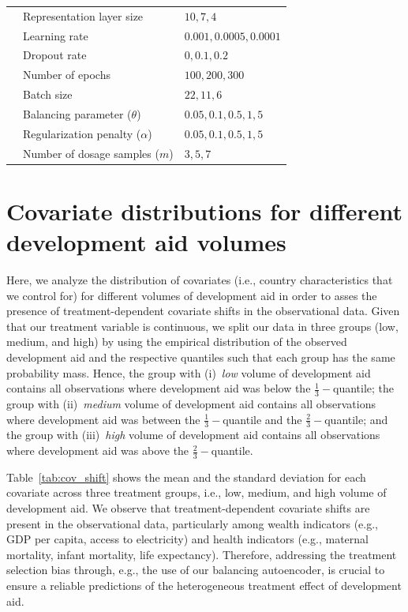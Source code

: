 \documentclass[sigconf]{acmart}
\begin{document}
\begin{table}[H]
\begin{center}
{\begin{tabular}{l l l }
    & Representation layer size & $ 10, 7, 4$ \\
    & Learning rate & $0.001, 0.0005, 0.0001$ \\
    & Dropout rate & $0, 0.1, 0.2$ \\
    & Number of epochs & $ 100, 200, 300$ \\
    & Batch size & $22, 11, 6$ \\
    & Balancing parameter ($\theta$) & $0.05, 0.1, 0.5, 1, 5$ \\
    & Regularization penalty ($\alpha$) & $0.05, 0.1, 0.5, 1, 5$ \\
    & Number of dosage samples ($m$) & $3, 5, 7$ \\
\hline \hline
\end{tabular}
}
\end{center}
\end{table}


\section{Covariate distributions for different development aid volumes}
\label{supp:covariate_shift_analysis} %

Here, we analyze the distribution of covariates (i.e., country characteristics that we control for) for different volumes of development aid in order to asses the presence of treatment-dependent covariate shifts in the observational data. Given that our treatment variable is continuous, we split our data in three groups (low, medium, and high) by using the empirical distribution of the observed development aid and the respective quantiles such that each group has the same probability mass. Hence, the group with (i)~\emph{low} volume of development aid contains all observations where development aid was below the $\frac{1}{3}-$quantile; the group with (ii)~\emph{medium} volume of development aid contains all observations where development aid was between the $\frac{1}{3}-$quantile and the $\frac{2}{3}-$quantile; and the group with (iii)~\emph{high} volume of development aid contains all observations where development aid was above the $\frac{2}{3}-$quantile. 

Table~\ref{tab:cov_shift} shows the mean and the standard deviation for each covariate across three treatment groups, i.e., low, medium, and high volume of development aid. We observe that treatment-dependent covariate shifts are present in the observational data, particularly among wealth indicators (e.g., GDP per capita, access to electricity) and health indicators (e.g., maternal mortality, infant mortality, life expectancy). Therefore, addressing the treatment selection bias through, e.g., the use of our balancing autoencoder, is crucial to ensure a reliable predictions of the heterogeneous treatment effect of development aid.
\end{document}

